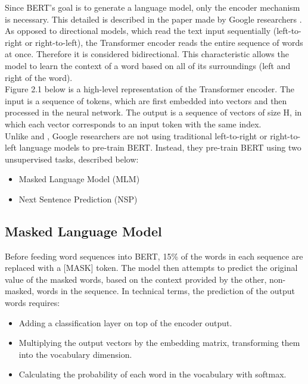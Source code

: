 Since BERT’s goal is to generate a language model, only the encoder mechanism is necessary. This detailed is described in the paper made by Google researchers \citeauthor{Devlin2018} \cite{Devlin2018}. \\

As opposed to directional models, which read the text input sequentially (left-to-right or right-to-left), the Transformer encoder reads the entire sequence of words at once. Therefore it is considered bidirectional. This characteristic allows the model to learn the context of a word based on all of its surroundings (left and right of the word).\\

Figure 2.1 below is a high-level representation of the Transformer encoder. The input is a sequence of tokens, which are first embedded into vectors and then processed in the neural network. The output is a sequence of vectors of size H, in which each vector corresponds to an input token with the same index. \\

Unlike \citeauthor{Peters2018} and \citeauthor{Radford2018}, Google researchers are not using traditional left-to-right or right-to-left language models to pre-train BERT. Instead, they pre-train BERT using two unsupervised tasks, described below:

\begin{itemize}
\item Masked Language Model (MLM)
\item Next Sentence Prediction (NSP)
\end{itemize}

\subsection{Masked Language Model}
Before feeding word sequences into BERT, 15{\%} of the words in each sequence are replaced with a [MASK] token. The model then attempts to predict the original value of the masked words, based on the context provided by the other, non-masked, words in the sequence. In technical terms, the prediction of the output words requires:
\begin{itemize}
\item Adding a classification layer on top of the encoder output.
\item Multiplying the output vectors by the embedding matrix, transforming them into the vocabulary dimension.
\item Calculating the probability of each word in the vocabulary with softmax.
\end{itemize}

